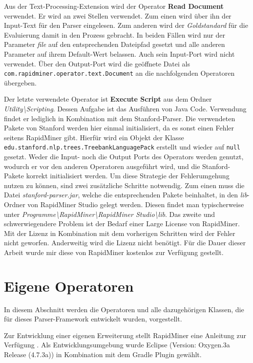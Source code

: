 Aus der Text-Processing-Extension wird der Operator \textbf{Read Document} verwendet. Er wird an zwei Stellen verwendet. Zum einen wird über ihn der Input-Text für den Parser eingelesen. Zum anderen wird der \textit{Goldstandard} für die Evaluierung damit in den Prozess gebracht. In beiden Fällen wird nur der Parameter \textit{file} auf den entsprechenden Dateipfad gesetzt und alle anderen Parameter auf ihrem Default-Wert belassen. Auch sein Input-Port wird nicht verwendet. Über den Output-Port wird die geöffnete Datei als \texttt{com.rapidminer.operator.text.Document} an die nachfolgenden Operatoren übergeben.

Der letzte verwendete Operator ist \textbf{Execute Script} aus dem Ordner \textit{Utility\textbackslash Scripting}. Dessen Aufgabe ist das Ausführen von Java Code. Verwendung findet er lediglich in Kombination mit dem Stanford-Parser. Die verwendeten Pakete von Stanford werden hier einmal initialisiert, da es sonst einen Fehler seitens RapidMiner gibt. Hierfür wird ein Objekt der Klasse  \texttt{edu.stanford.nlp.trees.TreebankLanguagePack} erstellt und wieder auf \texttt{null} gesetzt. Weder die Input- noch die Output Ports des Operators werden genutzt, wodurch er vor den anderen Operatoren ausgeführt wird, und die Stanford-Pakete korrekt initialisiert werden. Um diese Strategie der Fehlerumgehung nutzen zu können, sind zwei zusätzliche Schritte notwendig. Zum einen muss die Datei \textit{stanford-parser.jar}, welche die entsprechenden Pakete beinhaltet, in den \textit{lib}-Ordner von RapidMiner Studio gelegt werden. Diesen findet man typischerweise unter \textit{Programme\textbackslash RapidMiner\textbackslash RapidMiner Studio\textbackslash  lib}. Das zweite und schwerwiegendere Problem ist der Bedarf einer Large License von RapidMiner. Mit der Lizenz in Kombination mit dem vorherigen Schritten wird der Fehler nicht geworfen. Anderweitig wird die Lizenz nicht benötigt. Für die Dauer dieser Arbeit wurde mir diese von RapidMiner kostenlos zur Verfügung gestellt.
\section{Eigene Operatoren}
\label{sec:impl:eigene}

In diesem Abschnitt werden die Operatoren und alle dazugehörigen Klassen, die für dieses Parser-Framework entwickelt wurden, vorgestellt. 

Zur Entwicklung einer eigenen Erweiterung stellt RapidMiner eine Anleitung zur Verfügung \cite{rmguide}. 
Als Entwicklungsumgebung wurde Eclipse (Version: Oxygen.3a Release (4.7.3a)) in Kombination mit dem Gradle Plugin  gewählt. 

